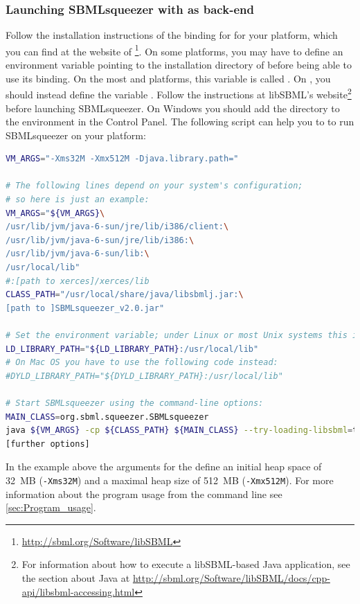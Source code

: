 \subsubsection{Launching SBMLsqueezer with \libSBML as back-end}
\label{sec:UsingLibSBML}
Follow the installation instructions of the \Java binding for \libSBML for your
platform, which you can find at the website of
\libSBML\footnote{\url{http://sbml.org/Software/libSBML}}.
On some platforms, you may have to define an environment variable pointing
to the installation directory of \libSBML before being able to use its \Java
binding.
On the most \Unix and \Linux platforms, this variable is called
\LDLIBRARYPATH.
On \MacOSX, you should instead define the variable \DYLDLIBRARYPATH.
Follow the instructions at libSBML's website\footnote{For information about how to execute a libSBML-based Java application, see the section about Java at \href{http://sbml.org/Software/libSBML/docs/cpp-api/libsbml-accessing.html}{\url{http://sbml.org/Software/libSBML/docs/cpp-api/libsbml-accessing.html}}} %
before launching SBMLsqueezer.
On Windows you should add the directory to the \PATH environment in the Control Panel.
The following script can help you to to run SBMLsqueezer on your \Unix platform:
\begin{lstlisting}[language=bash]
VM_ARGS="-Xms32M -Xmx512M -Djava.library.path="

# The following lines depend on your system's configuration;
# so here is just an example:
VM_ARGS="${VM_ARGS}\
/usr/lib/jvm/java-6-sun/jre/lib/i386/client:\
/usr/lib/jvm/java-6-sun/jre/lib/i386:\
/usr/lib/jvm/java-6-sun/lib:\
/usr/local/lib"
#:[path to xerces]/xerces/lib
CLASS_PATH="/usr/local/share/java/libsbmlj.jar:\
[path to ]SBMLsqueezer_v2.0.jar"

# Set the environment variable; under Linux or most Unix systems this is
LD_LIBRARY_PATH="${LD_LIBRARY_PATH}:/usr/local/lib"
# On Mac OS you have to use the following code instead:
#DYLD_LIBRARY_PATH="${DYLD_LIBRARY_PATH}:/usr/local/lib"

# Start SBMLsqueezer using the command-line options:
MAIN_CLASS=org.sbml.squeezer.SBMLsqueezer 
java ${VM_ARGS} -cp ${CLASS_PATH} ${MAIN_CLASS} --try-loading-libsbml=true\
[further options]
\end{lstlisting}
In the example above the arguments for the \JVM define an initial heap space of
32~MB (\texttt{-Xms32M}) and a maximal heap size of 512~MB (\texttt{-Xmx512M}).
For more information about the program usage from the command line see \vref{sec:Program_usage}.

